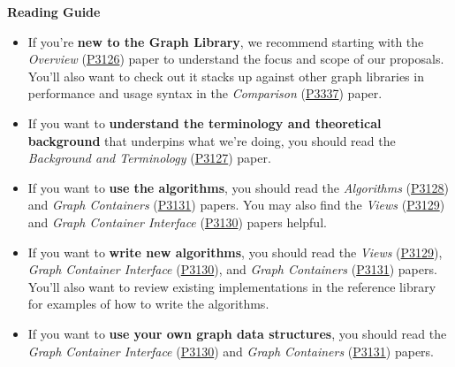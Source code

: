 \textbf{Reading Guide} 
\begin{itemize}
  \item If you're \textbf{new to the Graph Library}, we recommend starting with the \textit{Overview} (\href{https://www.wg21.link/P3126}{P3126}) paper to understand the focus and scope of our proposals.
        You'll also want to check out it stacks up against other graph libraries in performance and usage syntax in the \textit{Comparison} (\href{https://www.wg21.link/P3337}{P3337}) paper.
  \item If you want to \textbf{understand the terminology and theoretical background} that underpins what we're doing, you should read the \textit{Background and Terminology} (\href{https://www.wg21.link/P3127}{P3127}) paper.
  \item If you want to \textbf{use the algorithms}, you should read the \textit{Algorithms} (\href{https://www.wg21.link/P3128}{P3128}) and \textit{Graph Containers} (\href{https://www.wg21.link/P3131}{P3131}) papers.
        You may also find the \textit{Views} (\href{https://www.wg21.link/P3129}{P3129}) and \textit{Graph Container Interface} (\href{https://www.wg21.link/P3130}{P3130}) papers helpful. 
  \item If you want to \textbf{write new algorithms}, you should read the \textit{Views} (\href{https://www.wg21.link/P3129}{P3129}), \textit{Graph Container Interface} (\href{https://www.wg21.link/P3130}{P3130}), and \textit{Graph Containers} (\href{https://www.wg21.link/P3131}{P3131}) papers.
        You'll also want to review existing implementations in the reference library for examples of how to write the algorithms.
  \item If you want to \textbf{use your own graph data structures}, you should read the \textit{Graph Container Interface} (\href{https://www.wg21.link/P3130}{P3130}) and \textit{Graph Containers} (\href{https://www.wg21.link/P3131}{P3131}) papers.
\end{itemize}

  
%
